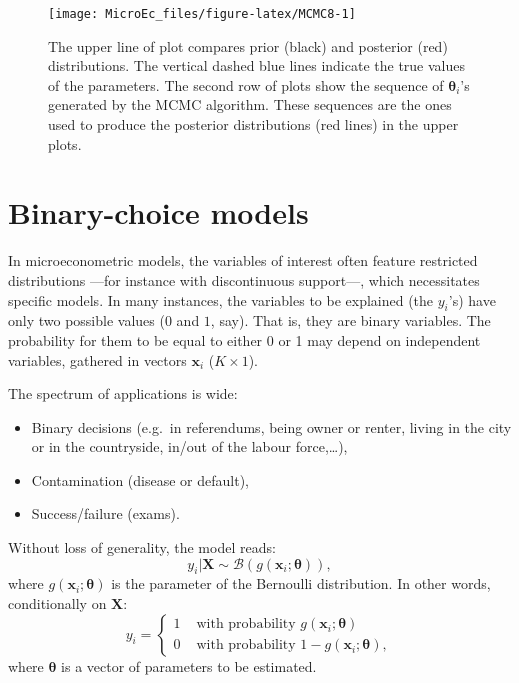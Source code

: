\documentclass[
  12pt,
]{book}
\providecommand{\tightlist}{%
  \setlength{\itemsep}{0pt}\setlength{\parskip}{0pt}}
\theoremstyle{definition}
\theoremstyle{definition}
\theoremstyle{definition}
\theoremstyle{definition}
\theoremstyle{remark}
\begin{document}
\begin{figure}
\texttt{[image: MicroEc\_files/figure-latex/MCMC8-1]} \caption{The upper line of plot compares prior (black) and posterior (red) distributions. The vertical dashed blue lines indicate the true values of the parameters. The second row of plots show the sequence of $\boldsymbol\theta_i$'s generated by the MCMC algorithm. These sequences are the ones used to produce the posterior distributions (red lines) in the upper plots.}\label{fig:MCMC8}
\end{figure}

\hypertarget{binary-choice-models}{%
\chapter{Binary-choice models}\label{binary-choice-models}}

In microeconometric models, the variables of interest often feature restricted distributions ---for instance with discontinuous support---, which necessitates specific models. In many instances, the variables to be explained (the \(y_i\)'s) have only two possible values (\(0\) and \(1\), say). That is, they are binary variables. The probability for them to be equal to either 0 or 1 may depend on independent variables, gathered in vectors \(\mathbf{x}_i\) (\(K \times 1\)).

The spectrum of applications is wide:

\begin{itemize}
\tightlist
\item
  Binary decisions (e.g.~in referendums, being owner or renter, living in the city or in the countryside, in/out of the labour force,\ldots),
\item
  Contamination (disease or default),
\item
  Success/failure (exams).
\end{itemize}

Without loss of generality, the model reads:
\begin{equation}\label{eq:binaryBenroulli}
y_i | \mathbf{X} \sim \mathcal{B}(g(\mathbf{x}_i;\boldsymbol\theta)),
\end{equation}
where \(g(\mathbf{x}_i;\boldsymbol\theta)\) is the parameter of the Bernoulli distribution. In other words, conditionally on \(\mathbf{X}\):
\begin{equation}
y_i = \left\{
\begin{array}{cl}
1 & \mbox{ with probability } g(\mathbf{x}_i;\boldsymbol\theta)\\
0 & \mbox{ with probability } 1-g(\mathbf{x}_i;\boldsymbol\theta),
\end{array}
\right.\label{eq:genericBinary}
\end{equation}
where \(\boldsymbol\theta\) is a vector of parameters to be estimated.
\end{document}
